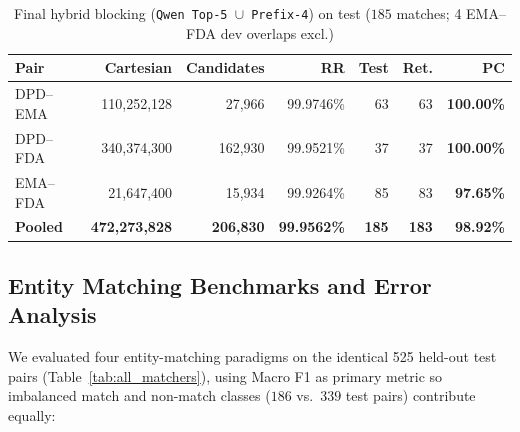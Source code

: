 \documentclass{llncs}
\begin{document}
\begin{table}[htbp]
\centering
\caption{Final hybrid blocking (\texttt{Qwen Top-5 $\cup$ Prefix-4}) on test ($185$ matches; 4 EMA--FDA dev overlaps excl.)}
\label{tab:blocking_candidates}
\scriptsize
\setlength{\tabcolsep}{2.5pt}
\begin{tabular}{|l|r|r|r|r|r|r|}
\hline
\textbf{Pair} & \textbf{Cartesian} & \textbf{Candidates} & \textbf{RR} & \textbf{Test} & \textbf{Ret.} & \textbf{PC} \\
\hline
DPD--EMA & 110,252,128 &  27,966 & 99.9746\% & 63 & 63 & \textbf{100.00\%} \\
DPD--FDA & 340,374,300 & 162,930 & 99.9521\% & 37 & 37 & \textbf{100.00\%} \\
EMA--FDA &  21,647,400 &  15,934 & 99.9264\% & 85 & 83 &  \textbf{97.65\%} \\
\hline
\textbf{Pooled} & \textbf{472,273,828} & \textbf{206,830} & \textbf{99.9562\%} & \textbf{185} & \textbf{183} & \textbf{98.92\%} \\
\hline
\end{tabular}
\end{table}

\subsection{Entity Matching Benchmarks and Error Analysis}

We evaluated four entity-matching paradigms on the identical 525 held-out test pairs (Table~\ref{tab:all_matchers}), using Macro F1 as primary metric so imbalanced match and non-match classes ($186$ vs.\ $339$ test pairs) contribute equally:
\end{document}

